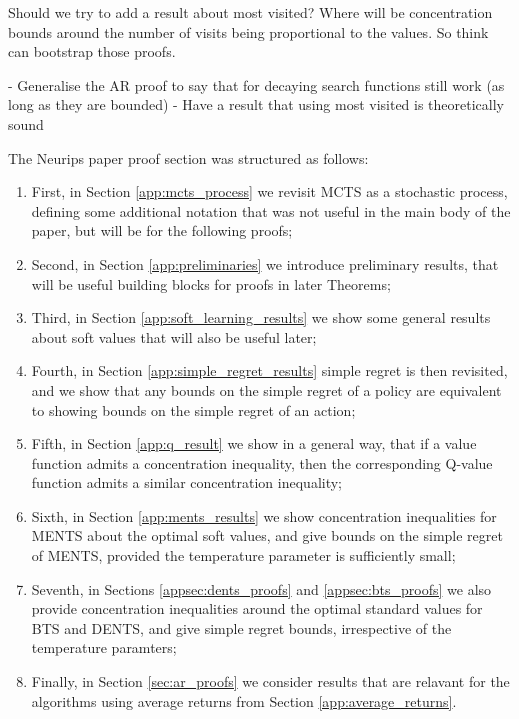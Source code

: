 
    Should we try to add a result about most visited? Where will be concentration bounds around the number of visits being proportional to the values. So think can bootstrap those proofs.

    - Generalise the AR proof to say that for decaying search functions still work (as long as they are bounded)
    - Have a result that using most visited is theoretically sound

    The Neurips paper proof section was structured as follows:
    \begin{enumerate}
        \item First, in Section \ref{app:mcts_process} we revisit MCTS as a stochastic process, defining some additional notation that was not useful in the main body of the paper, but will be for the following proofs;
        \item Second, in Section \ref{app:preliminaries} we introduce preliminary results, that will be useful building blocks for proofs in later Theorems;
        \item Third, in Section \ref{app:soft_learning_results} we show some general results about soft values that will also be useful later;
        \item Fourth, in Section \ref{app:simple_regret_results} simple regret is then revisited, and we show that any bounds on the simple regret of a policy are equivalent to showing bounds on the simple regret of an action;
        \item Fifth, in Section \ref{app:q_result} we show in a general way, that if a value function admits a concentration inequality, then the corresponding Q-value function admits a similar concentration inequality;
        \item Sixth, in Section \ref{app:ments_results} we show concentration inequalities for MENTS about the optimal soft values, and give bounds on the simple regret of MENTS, provided the temperature parameter is sufficiently small;
        \item Seventh, in Sections \ref{appsec:dents_proofs} and \ref{appsec:bts_proofs} we also provide concentration inequalities around the optimal standard values for BTS and DENTS, and give simple regret bounds, irrespective of the temperature paramters;
        \item Finally, in Section \ref{sec:ar_proofs} we consider results that are relavant for the algorithms using average returns from Section \ref{app:average_returns}.
    \end{enumerate}













